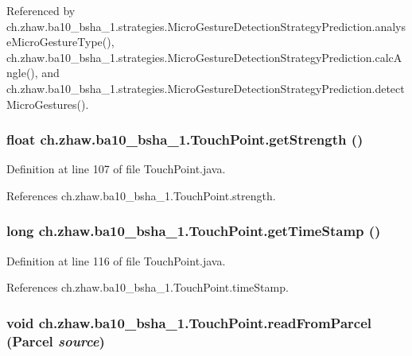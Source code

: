 Referenced by ch.zhaw.ba10\_\-bsha\_\-1.strategies.MicroGestureDetectionStrategyPrediction.analyseMicroGestureType(), ch.zhaw.ba10\_\-bsha\_\-1.strategies.MicroGestureDetectionStrategyPrediction.calcAngle(), and ch.zhaw.ba10\_\-bsha\_\-1.strategies.MicroGestureDetectionStrategyPrediction.detectMicroGestures().\hypertarget{classch_1_1zhaw_1_1ba10__bsha__1_1_1TouchPoint_a2297107f0bc05baf381fc9b8653a6df2}{
\subsubsection[{getStrength}]{\setlength{\rightskip}{0pt plus 5cm}float ch.zhaw.ba10\_\-bsha\_\-1.TouchPoint.getStrength ()}}
\label{classch_1_1zhaw_1_1ba10__bsha__1_1_1TouchPoint_a2297107f0bc05baf381fc9b8653a6df2}


Definition at line 107 of file TouchPoint.java.

References ch.zhaw.ba10\_\-bsha\_\-1.TouchPoint.strength.\hypertarget{classch_1_1zhaw_1_1ba10__bsha__1_1_1TouchPoint_aa25d5cf22375b6c5f8e59bccc2ec69d0}{
\subsubsection[{getTimeStamp}]{\setlength{\rightskip}{0pt plus 5cm}long ch.zhaw.ba10\_\-bsha\_\-1.TouchPoint.getTimeStamp ()}}
\label{classch_1_1zhaw_1_1ba10__bsha__1_1_1TouchPoint_aa25d5cf22375b6c5f8e59bccc2ec69d0}


Definition at line 116 of file TouchPoint.java.

References ch.zhaw.ba10\_\-bsha\_\-1.TouchPoint.timeStamp.\hypertarget{classch_1_1zhaw_1_1ba10__bsha__1_1_1TouchPoint_a23cc1e796d80c3fb6b7ca66fcecdd01e}{
\subsubsection[{readFromParcel}]{\setlength{\rightskip}{0pt plus 5cm}void ch.zhaw.ba10\_\-bsha\_\-1.TouchPoint.readFromParcel (Parcel {\em source})}}
\label{classch_1_1zhaw_1_1ba10__bsha__1_1_1TouchPoint_a23cc1e796d80c3fb6b7ca66fcecdd01e}


